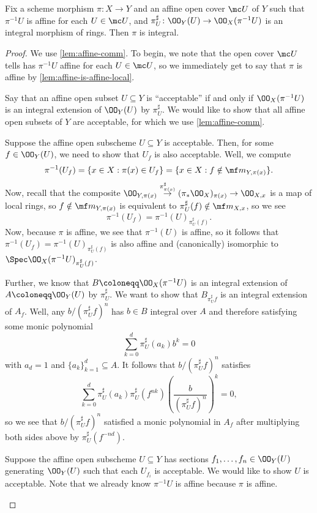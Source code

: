 \documentclass[../notes.tex]{subfiles}
\begin{document}
\begin{lemma} \label{lem:almost-integral-affine-local-target}
	Fix a scheme morphism $\pi\colon X\to Y$ and an affine open cover $\mc U$ of $Y$ such that $\pi^{-1}U$ is affine for each $U\in\mc U$, and $\pi^\sharp_U\colon\OO_Y(U)\to\OO_X(\pi^{-1}U)$ is an integral morphism of rings. Then $\pi$ is integral.
\end{lemma}
\begin{proof}
	We use \autoref{lem:affine-comm}. To begin, we note that the open cover $\mc U$ tells has $\pi^{-1}U$ affine for each $U\in\mc U$, so we immediately get to say that $\pi$ is affine by \autoref{lem:affine-is-affine-local}.
	
	Say that an affine open subset $U\subseteq Y$ is ``acceptable'' if and only if $\OO_X(\pi^{-1}U)$ is an integral extension of $\OO_Y(U)$ by $\pi^\sharp_U$. We would like to show that all affine open subsets of $Y$ are acceptable, for which we use \autoref{lem:affine-comm}.
	\begin{listroman}
		\item Suppose the affine open subscheme $U\subseteq Y$ is acceptable. Then, for some $f\in\OO_Y(U)$, we need to show that $U_f$ is also acceptable. Well, we compute
		\[\pi^{-1}(U_f)=\{x\in X:\pi(x)\in U_f\}=\{x\in X:f\notin\mf m_{Y,\pi(x)}\}.\]
		Now, recall that the composite $\OO_{Y,\pi(x)}\stackrel{\pi^\sharp_{\pi(x)}}\to(\pi_*\OO_{X})_{\pi(x)}\to\OO_{X,x}$ is a map of local rings, so $f\notin\mf m_{Y,\pi(x)}$ is equivalent to $\pi^\sharp_U(f)\notin\mf m_{X,x}$, so we see
		\[\pi^{-1}(U_f)=\pi^{-1}(U)_{\pi^\sharp_U(f)}.\]
		Now, because $\pi$ is affine, we see that $\pi^{-1}(U)$ is affine, so it follows that $\pi^{-1}(U_f)=\pi^{-1}(U)_{\pi^\sharp_U(f)}$ is also affine and (canonically) isomorphic to $\Spec\OO_X(\pi^{-1}U)_{\pi^\sharp_U(f)}$.
		
		Further, we know that $B\coloneqq\OO_X(\pi^{-1}U)$ is an integral extension of $A\coloneqq\OO_Y(U)$ by $\pi^\sharp_U$. We want to show that $B_{\pi^\sharp_Uf}$ is an integral extension of $A_f$. Well, any $b/(\pi^\sharp_Uf)^n$ has $b\in B$ integral over $A$ and therefore satisfying some monic polynomial
		\[\sum_{k=0}^d\pi^\sharp_U(a_k)b^k=0\]
		with $a_d=1$ and $\{a_k\}_{k=1}^d\subseteq A$. It follows that $b/(\pi^\sharp_Uf)^n$ satisfies
		\[\sum_{k=0}^d\pi^\sharp_U(a_k)\pi^\sharp_U(f^{nk})\left(\frac b{(\pi^\sharp_Uf)^n}\right)^k=0,\]
		so we see that $b/(\pi^\sharp_Uf)^n$ satisfied a monic polynomial in $A_f$ after multiplying both sides above by $\pi^\sharp_U(f^{-nd})$.
		\item Suppose the affine open subscheme $U\subseteq Y$ has sections $f_1,\ldots,f_n\in\OO_Y(U)$ generating $\OO_Y(U)$ such that each $U_{f_i}$ is acceptable. We would like to show $U$ is acceptable. Note that we already know $\pi^{-1}U$ is affine because $\pi$ is affine.


\end{listroman}
\end{proof}
\end{document}
